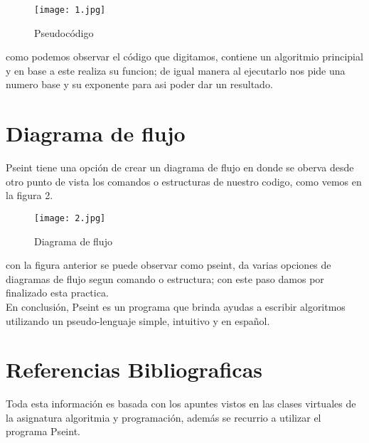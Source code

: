 \documentclass[letterpaper,12pt]{article}
\begin{document}
\begin{figure}[h!]
\centering 
\texttt{[image: 1.jpg]}%
\caption{Pseudocódigo}
\label{Figura: 1}
\end{figure}
\vspace{10cm} %
como podemos observar el código que digitamos, contiene un algoritmio principial y en base a este realiza su funcion; de igual manera al ejecutarlo nos pide una numero base y su exponente para asi poder dar un resultado.
\\
\section{Diagrama de flujo}
Pseint tiene una opción de crear un diagrama de flujo en donde se oberva desde otro punto de vista los comandos o estructuras de nuestro codigo, como vemos en la figura 2.
\begin{figure}[h!]
\centering 
\texttt{[image: 2.jpg]}
\caption{Diagrama de flujo}
\label{Figura: 2}
\end{figure}

con la figura anterior se puede observar como pseint, da varias opciones de diagramas de flujo segun comando o estructura; con este paso damos por finalizado esta practica.
\\ En conclusión, Pseint es un programa que brinda ayudas a escribir algoritmos utilizando un pseudo-lenguaje simple, intuitivo y en español.\\
\section{Referencias Bibliograficas}
Toda esta información es basada con los apuntes vistos en las clases virtuales de la asignatura algoritmia y programación, además se recurrio a utilizar el programa Pseint.
\end{document}
